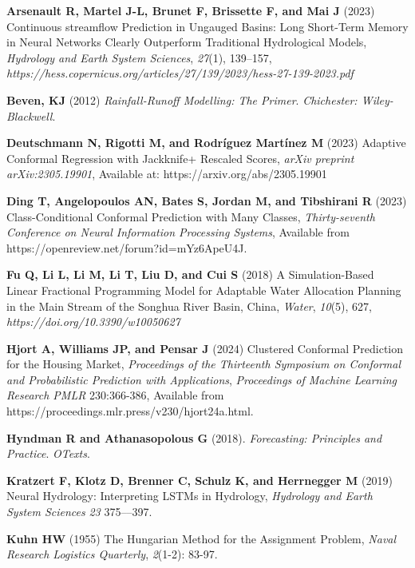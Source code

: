 \documentclass[ruler]{CUP-JNL-EDS}%
\begin{document}
\begin{Backmatter}
\begin{thebibliography}{}
\textbf{Arsenault R, Martel J-L, Brunet F, Brissette F, and Mai J} (2023) Continuous streamflow Prediction in Ungauged Basins: Long Short-Term Memory in Neural Networks Clearly Outperform Traditional Hydrological Models, \textit{Hydrology and Earth System Sciences}, \textit{27}(1), 139–157, \textit{https://hess.copernicus.org/articles/27/139/2023/hess-27-139-2023.pdf}

\textbf{Beven, KJ} (2012) \emph{Rainfall-Runoff Modelling: The Primer}. \textit{Chichester: Wiley-Blackwell}.

\textbf{Deutschmann N, Rigotti M, and Rodríguez Martínez M} (2023) Adaptive Conformal Regression with Jackknife+ Rescaled Scores, \textit{arXiv preprint arXiv:2305.19901}, Available at: https://arxiv.org/abs/2305.19901

\textbf{Ding T, Angelopoulos AN, Bates S, Jordan M, and Tibshirani R} (2023) Class-Conditional Conformal Prediction with Many Classes, \textit{Thirty-seventh Conference on Neural Information Processing Systems}, Available from https://openreview.net/forum?id=mYz6ApeU4J.

\textbf{Fu Q, Li L, Li M, Li T, Liu D, and Cui S} (2018) A Simulation-Based Linear Fractional Programming Model for Adaptable Water Allocation Planning in the Main Stream of the Songhua River Basin, China, \textit{Water}, \textit{10}(5), 627, \textit{https://doi.org/10.3390/w10050627}

\textbf{Hjort A, Williams JP, and Pensar J} (2024) Clustered Conformal Prediction for the Housing Market, \textit{Proceedings of the Thirteenth Symposium on Conformal and Probabilistic Prediction with Applications}, \textit{Proceedings of Machine Learning Research PMLR} 230:366-386, Available from https://proceedings.mlr.press/v230/hjort24a.html.

\textbf{Hyndman R and Athanasopolous G} (2018). \textit{Forecasting: Principles and Practice}. \textit{OTexts}.

\textbf{Kratzert F, Klotz D, Brenner C, Schulz K, and Herrnegger M} (2019) Neural Hydrology: Interpreting LSTMs in Hydrology, \textit{Hydrology and Earth System Sciences} \textit{23} {375}–--{397}.

\textbf{Kuhn HW} (1955) The Hungarian Method for the Assignment Problem, \textit{Naval Research Logistics Quarterly}, \textit{2}(1-2): 83-97.


\end{thebibliography}
\end{Backmatter}
\end{document}
